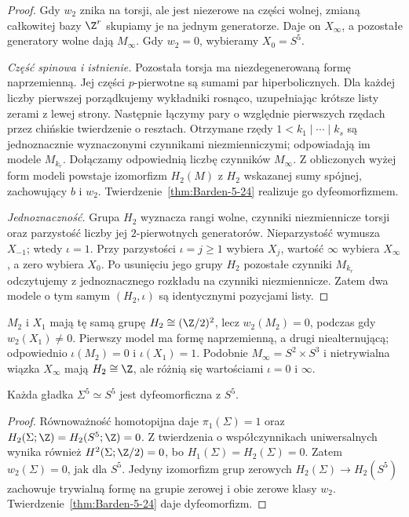\begin{proof}
Gdy $w_2$ znika na torsji, ale jest
niezerowe na części wolnej,
zmianą całkowitej bazy $\Z^r$
skupiamy je na jednym generatorze.
Daje on $X_\infty$, a pozostałe
generatory wolne dają $M_\infty$.
Gdy $w_2=0$, wybieramy $X_0=S^5$.

\emph{Część spinowa i istnienie.}
Pozostała torsja ma niezdegenerowaną
formę naprzemienną. Jej części
$p$-pierwotne są sumami par
hiperbolicznych. Dla każdej liczby
pierwszej porządkujemy wykładniki
rosnąco, uzupełniając krótsze listy
zerami z lewej strony. Następnie
łączymy pary o względnie pierwszych
rzędach przez chińskie twierdzenie
o resztach. Otrzymane rzędy
$1<k_1\mid\cdots\mid k_s$
są jednoznacznie wyznaczonymi
czynnikami niezmienniczymi;
odpowiadają im modele $M_{k_r}$.
Dołączamy odpowiednią liczbę
czynników $M_\infty$.
Z obliczonych wyżej form modeli
powstaje izomorfizm $H_2(M)$
z $H_2$ wskazanej sumy spójnej,
zachowujący $b$ i $w_2$.
Twierdzenie~\ref{thm:Barden-5-24}
realizuje go dyfeomorfizmem.

\emph{Jednoznaczność.}
Grupa $H_2$ wyznacza rangi wolne,
czynniki niezmiennicze torsji oraz
parzystość liczby jej $2$-pierwotnych
generatorów. Nieparzystość wymusza
$X_{-1}$; wtedy $\iota=1$.
Przy parzystości $\iota=j\geq1$
wybiera $X_j$, wartość $\infty$
wybiera $X_\infty$, a zero wybiera
$X_0$. Po usunięciu jego grupy
$H_2$ pozostałe czynniki $M_{k_r}$
odczytujemy z jednoznacznego rozkładu
na czynniki niezmiennicze.
Zatem dwa modele o tym samym
$(H_2,\iota)$ są identycznymi
pozycjami listy.
\end{proof}

\begin{przyklad}
$M_2$ i $X_1$ mają tę samą grupę
$H_2\cong(\Z/2)^2$, lecz
$w_2(M_2)=0$, podczas gdy
$w_2(X_1)\ne0$. Pierwszy model ma
formę naprzemienną, a drugi
niealternującą; odpowiednio
$\iota(M_2)=0$ i $\iota(X_1)=1$.
Podobnie $M_\infty=S^2\times S^3$
i nietrywialna wiązka $X_\infty$
mają $H_2\cong\Z$, ale różnią się
wartościami $\iota=0$ i $\infty$.
\end{przyklad}

\begin{wniosek}
\label{cor:poincare-five-24}
Każda gładka $\Sigma^5\simeq S^5$
jest dyfeomorficzna z $S^5$.
\end{wniosek}
\begin{proof}
Równoważność homotopijna daje
$\pi_1(\Sigma)=1$ oraz
$H_2(\Sigma;\Z)=H_2(S^5;\Z)=0$.
Z twierdzenia o współczynnikach
uniwersalnych wynika również
$H^2(\Sigma;\Z/2)=0$, bo
$H_1(\Sigma)=H_2(\Sigma)=0$.
Zatem $w_2(\Sigma)=0$, jak dla $S^5$.
Jedyny izomorfizm grup zerowych
$H_2(\Sigma)\to H_2(S^5)$
zachowuje trywialną formę na grupie zerowej
i obie zerowe klasy $w_2$.
Twierdzenie~\ref{thm:Barden-5-24}
daje dyfeomorfizm.
\end{proof}

